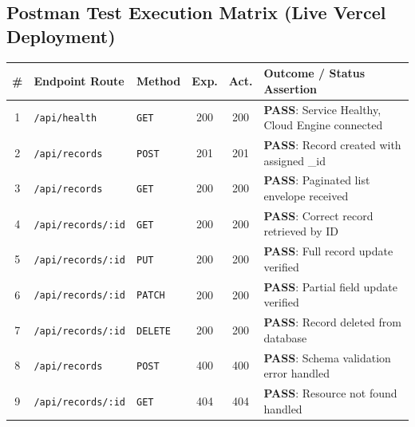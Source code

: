\documentclass[11pt,a4paper]{article}
\begin{document}
\subsection{Postman Test Execution Matrix (Live Vercel Deployment)}
\begin{center}
\renewcommand{\arraystretch}{1.25}
\begin{tabularx}{\textwidth}{|c|l|l|c|c|X|}
\hline
\textbf{\#} & \textbf{Endpoint Route} & \textbf{Method} & \textbf{Exp.} & \textbf{Act.} & \textbf{Outcome / Status Assertion} \\ \hline
1 & \texttt{/api/health} & \texttt{GET} & 200 & 200 & \textbf{PASS}: Service Healthy, Cloud Engine connected \\ \hline
2 & \texttt{/api/records} & \texttt{POST} & 201 & 201 & \textbf{PASS}: Record created with assigned \_id \\ \hline
3 & \texttt{/api/records} & \texttt{GET} & 200 & 200 & \textbf{PASS}: Paginated list envelope received \\ \hline
4 & \texttt{/api/records/:id} & \texttt{GET} & 200 & 200 & \textbf{PASS}: Correct record retrieved by ID \\ \hline
5 & \texttt{/api/records/:id} & \texttt{PUT} & 200 & 200 & \textbf{PASS}: Full record update verified \\ \hline
6 & \texttt{/api/records/:id} & \texttt{PATCH} & 200 & 200 & \textbf{PASS}: Partial field update verified \\ \hline
7 & \texttt{/api/records/:id} & \texttt{DELETE} & 200 & 200 & \textbf{PASS}: Record deleted from database \\ \hline
8 & \texttt{/api/records} & \texttt{POST} & 400 & 400 & \textbf{PASS}: Schema validation error handled \\ \hline
9 & \texttt{/api/records/:id} & \texttt{GET} & 404 & 404 & \textbf{PASS}: Resource not found handled \\ \hline
\end{tabularx}
\end{center}
\end{document}
